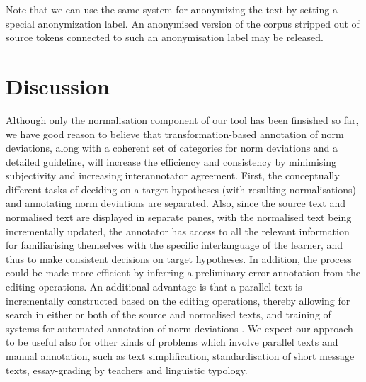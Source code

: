 \documentclass[10pt, a4paper]{article}
\newcommand{\dan}[1]{{\color{Fuchsia}{Dan: #1}}}
\newcommand{\elena}[1]{{\color{BrickRed}{Elena: #1}}}
\newcommand{\normAnn}[0]{our tool }
\begin{document}
Note that we can use the same system for anonymizing the text by setting a
special anonymization label. An anonymised version of the corpus stripped
out of source tokens connected to such an anonymisation label may be released.\dan{move to discussion}

\section{Discussion}
\label{sec:discussion}


Although only the normalisation component of \normAnn has been finsished so far, we have good reason to believe that transformation-based annotation of norm deviations, along with a coherent set of categories for norm deviations and a detailed guideline, will increase the efficiency and consistency by minimising subjectivity and increasing interannotator agreement. \dan{Because:}
First, the conceptually different tasks of deciding on a target hypotheses (with resulting normalisations) and annotating norm deviations are separated. 
Also, since the source text and normalised text are displayed in separate panes, with the normalised text being incrementally updated, the annotator has access to all the relevant information for familiarising themselves with the specific interlanguage of the learner, and thus to make consistent decisions on target hypotheses. 
In addition, the process could be made more efficient by inferring a preliminary error annotation from the editing operations. An additional advantage is that a parallel text is incrementally constructed based on the editing operations, thereby allowing for search in either or both of the source and normalised texts, and training of systems for automated annotation of norm deviations \cite{sproat2016rnn}. 
We expect our approach to be useful also for other kinds of problems which involve parallel texts and manual annotation, such as text simplification, standardisation of short message texts, essay-grading by teachers and linguistic typology. %

\end{document}

